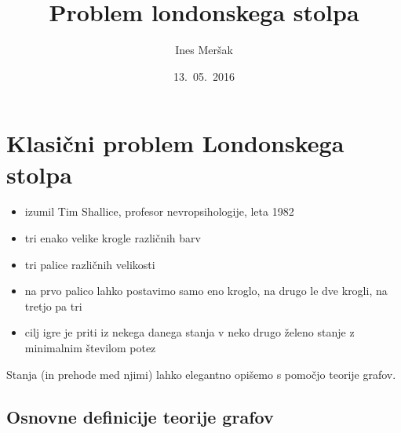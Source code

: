 \documentclass[11pt,a4paper]{article}
\title{Problem londonskega stolpa}
\author{Ines Meršak}
\date{13.~05.~2016}
\theoremstyle{definition} %
\theoremstyle{plain} %
\begin{document}
\maketitle

 
\section{Klasični problem Londonskega stolpa}

\begin{itemize}
    \item izumil Tim Shallice, profesor nevropsihologije, leta 1982
    \item tri enako velike krogle različnih barv
    \item tri palice različnih velikosti
    \item na prvo palico lahko postavimo samo eno kroglo, na drugo le dve krogli, na tretjo pa tri
    \item cilj igre je priti iz nekega danega stanja v neko drugo želeno stanje z minimalnim številom potez
\end{itemize}
    
Stanja (in prehode med njimi) lahko elegantno opišemo s pomočjo teorije grafov.

\subsection{Osnovne definicije teorije grafov}
\end{document}

